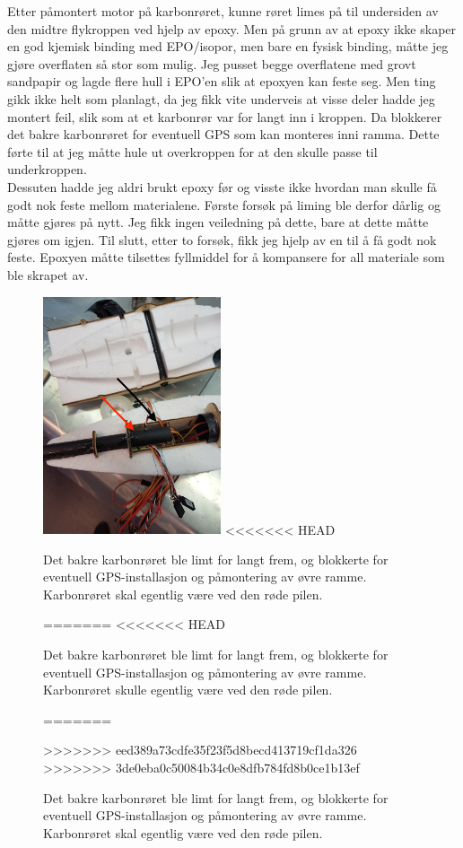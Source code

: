 \documentclass[12pt, a4paper]{article}
\begin{document}
\newpage
Etter påmontert motor på karbonrøret, kunne røret limes på til undersiden av den midtre flykroppen ved hjelp av epoxy. Men på grunn av at epoxy ikke skaper en god kjemisk binding med EPO/isopor, men bare en fysisk binding, måtte jeg gjøre overflaten så stor som mulig. Jeg pusset begge overflatene med grovt sandpapir og lagde flere hull i EPO'en slik at epoxyen kan feste seg. 
Men ting gikk ikke helt som planlagt, da jeg fikk vite underveis at visse deler hadde jeg montert feil, slik som at et karbonrør var for langt inn i kroppen. Da blokkerer det bakre karbonrøret for eventuell GPS som kan monteres inni ramma. Dette førte til at jeg måtte hule ut overkroppen for at den skulle passe til underkroppen. \\
Dessuten hadde jeg aldri brukt epoxy før og visste ikke hvordan man skulle få godt nok feste mellom materialene. Første forsøk på liming ble derfor dårlig og måtte gjøres på nytt. Jeg fikk ingen veiledning på dette, bare at dette måtte gjøres om igjen. Til slutt, etter to forsøk, fikk jeg hjelp av en til å få godt nok feste. Epoxyen måtte tilsettes fyllmiddel for å kompansere for all materiale som ble skrapet av. \\


\begin{figure}[ht]
	\centering
	\includegraphics[height = 7cm, width = .6\textwidth]{bilder/feilmontering_av_karbon_red.jpg}
<<<<<<< HEAD
	\caption[Feilliming]{Det bakre karbonrøret ble limt for langt frem, og blokkerte for eventuell GPS-installasjon og påmontering av øvre ramme. Karbonrøret skal egentlig være ved den røde pilen.}
=======
<<<<<<< HEAD
	\caption{Det bakre karbonrøret ble limt for langt frem, og blokkerte for eventuell GPS-installasjon og påmontering av øvre ramme. Karbonrøret skulle egentlig være ved den røde pilen.}
=======
	\caption[Feilliming]{Det bakre karbonrøret ble limt for langt frem, og blokkerte for eventuell GPS-installasjon og påmontering av øvre ramme. Karbonrøret skal egentlig være ved den røde pilen.}
>>>>>>> eed389a73cdfe35f23f5d8becd413719cf1da326
>>>>>>> 3de0eba0c50084b34c0e8dfb784fd8b0ce1b13ef
\end{figure}
\end{document}
